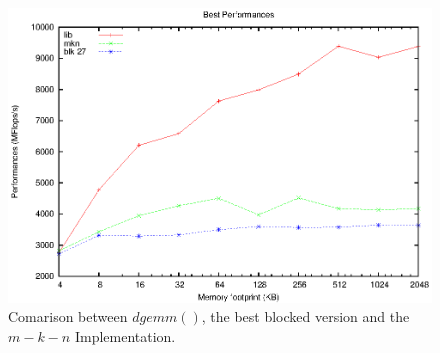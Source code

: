 \begin{figure}[here]
\centering
\includegraphics[width=\textwidth]{results/3way.eps}
\caption{Comarison between $dgemm()$, the best blocked version and the $m-k-n$ Implementation.}
\label{fig:3way}
\end{figure}



